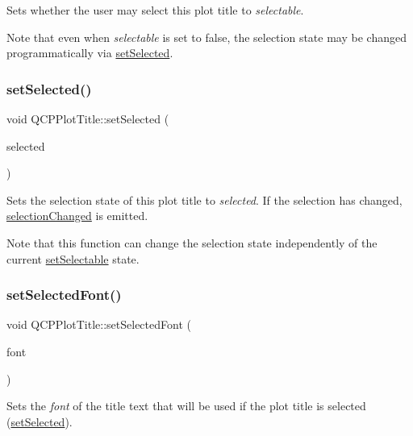 Sets whether the user may select this plot title to {\itshape selectable}.

Note that even when {\itshape selectable} is set to {\ttfamily false}, the selection state may be changed programmatically via \mbox{\hyperlink{class_q_c_p_plot_title_a8d441a889d371307df86f1ab7687a333}{set\+Selected}}. \mbox{\label{class_q_c_p_plot_title_a8d441a889d371307df86f1ab7687a333}} 
\subsubsection{\texorpdfstring{set\+Selected()}{setSelected()}}
{\footnotesize\ttfamily void Q\+C\+P\+Plot\+Title\+::set\+Selected (\begin{DoxyParamCaption}\item[{bool}]{selected }\end{DoxyParamCaption})}

Sets the selection state of this plot title to {\itshape selected}. If the selection has changed, \mbox{\hyperlink{class_q_c_p_plot_title_a3a01ede2da3b0b5eda33aa5274cc3523}{selection\+Changed}} is emitted.

Note that this function can change the selection state independently of the current \mbox{\hyperlink{class_q_c_p_plot_title_a8866b07b9fa14877d4cefbf38406c5dd}{set\+Selectable}} state. \mbox{\label{class_q_c_p_plot_title_a5245980ead999ceed51dbe702d0e3131}} 
\subsubsection{\texorpdfstring{set\+Selected\+Font()}{setSelectedFont()}}
{\footnotesize\ttfamily void Q\+C\+P\+Plot\+Title\+::set\+Selected\+Font (\begin{DoxyParamCaption}\item[{const Q\+Font \&}]{font }\end{DoxyParamCaption})}

Sets the {\itshape font} of the title text that will be used if the plot title is selected (\mbox{\hyperlink{class_q_c_p_plot_title_a8d441a889d371307df86f1ab7687a333}{set\+Selected}}).

